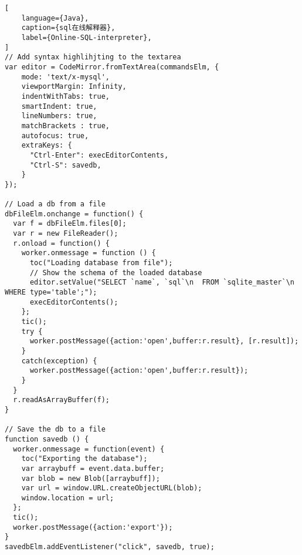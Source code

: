 \begin{lstlisting}[
    language={Java},
    caption={sql在线解释器},
    label={Online-SQL-interpreter},
]
// Add syntax highlihjting to the textarea
var editor = CodeMirror.fromTextArea(commandsElm, {
    mode: 'text/x-mysql',
    viewportMargin: Infinity,
    indentWithTabs: true,
    smartIndent: true,
    lineNumbers: true,
    matchBrackets : true,
    autofocus: true,
    extraKeys: {
      "Ctrl-Enter": execEditorContents,
      "Ctrl-S": savedb,
    }
});

// Load a db from a file
dbFileElm.onchange = function() {
  var f = dbFileElm.files[0];
  var r = new FileReader();
  r.onload = function() {
    worker.onmessage = function () {
      toc("Loading database from file");
      // Show the schema of the loaded database
      editor.setValue("SELECT `name`, `sql`\n  FROM `sqlite_master`\n  WHERE type='table';");
      execEditorContents();
    };
    tic();
    try {
      worker.postMessage({action:'open',buffer:r.result}, [r.result]);
    }
    catch(exception) {
      worker.postMessage({action:'open',buffer:r.result});
    }
  }
  r.readAsArrayBuffer(f);
}

// Save the db to a file
function savedb () {
  worker.onmessage = function(event) {
    toc("Exporting the database");
    var arraybuff = event.data.buffer;
    var blob = new Blob([arraybuff]);
    var url = window.URL.createObjectURL(blob);
    window.location = url;
  };
  tic();
  worker.postMessage({action:'export'});
}
savedbElm.addEventListener("click", savedb, true);
\end{lstlisting}